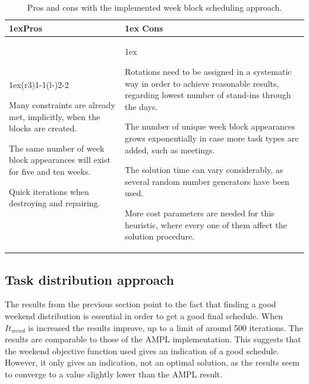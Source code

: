 \begin{table}[H]
\caption{Pros and cons with the implemented week block scheduling approach.}
\label{tab:pros_cons_weekly_scheduling}
\begin{tabularx}{\linewidth}{>{\parskip1ex}X@{\kern4\tabcolsep}>{\parskip1ex}X}
\toprule
\hfil\bfseries Pros
&
\hfil\bfseries Cons
\\\cmidrule(r{3\tabcolsep}){1-1}\cmidrule(l{-\tabcolsep}){2-2}

Many constraints are already met, implicitly, when the blocks are created. \par
The same number of week block appearances will exist for five and ten weeks.\par
Quick iterations when destroying and repairing.\par

&

Rotations need to be assigned in a systematic way in order to achieve reasonable results, regarding lowest number of stand-ins through the days.\par
The number of unique week block appearances grows exponentially in case more task types are added, such as meetings.\par
The solution time can vary considerably, as several random number generators have been used.\par
More cost parameters are needed for this heuristic, where every one of them affect the solution procedure.

\\\bottomrule
\end{tabularx}
\end{table}

 

\subsection{Task distribution approach}
The results from the previous section point to the fact that finding a good weekend distribution is essential in order to get a good final schedule. When $It_{wend}$ is increased the results improve, up to a limit of around 500 iterations. The results are comparable to those of the AMPL implementation. This suggests that the weekend objective function used gives an indication of a good schedule. However, it only gives an indication, not an optimal solution, as the results seem to converge to a value slightly lower than the AMPL result. 

